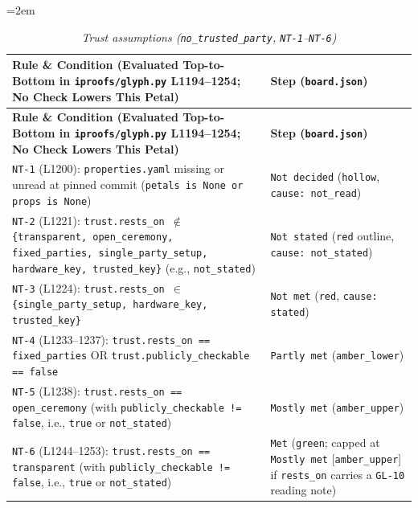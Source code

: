 \documentclass[11pt,letterpaper]{article}
\begin{document}
{\footnotesize\setlength{\tabcolsep}{4pt}\emergencystretch=2em
\begin{longtable}{@{}>{\raggedright\arraybackslash}p{} >{\raggedright\arraybackslash}p{}@{}}
\caption{\textit{Trust assumptions (\texttt{no\_\allowbreak{}trusted\_\allowbreak{}party}, \texttt{NT-1}--\texttt{NT-6})}} \\
\toprule
\textbf{Rule \& Condition (Evaluated Top-to-Bottom in \texttt{iproofs/\allowbreak{}glyph.\allowbreak{}py} L1194--1254; No Check Lowers This Petal)} & \textbf{Step (\texttt{board.\allowbreak{}json})} \\
\midrule
\endfirsthead
\toprule
\textbf{Rule \& Condition (Evaluated Top-to-Bottom in \texttt{iproofs/\allowbreak{}glyph.\allowbreak{}py} L1194--1254; No Check Lowers This Petal)} & \textbf{Step (\texttt{board.\allowbreak{}json})} \\
\midrule
\endhead
\bottomrule
\endfoot
\texttt{NT-1} (L1200): \texttt{properties.\allowbreak{}yaml} missing or unread at pinned commit (\texttt{petals is None or props is None}) & \texttt{Not decided} (\texttt{hollow}, \texttt{cause: not\_\allowbreak{}read}) \\
\texttt{NT-2} (L1221): \texttt{trust.\allowbreak{}rests\_\allowbreak{}on $\notin$ \{transparent, open\_\allowbreak{}ceremony, fixed\_\allowbreak{}parties, single\_\allowbreak{}party\_\allowbreak{}setup, hardware\_\allowbreak{}key, trusted\_\allowbreak{}key\}} (e.g., \texttt{not\_\allowbreak{}stated}) & \texttt{Not stated} (\texttt{red} outline, \texttt{cause: not\_\allowbreak{}stated}) \\
\texttt{NT-3} (L1224): \texttt{trust.\allowbreak{}rests\_\allowbreak{}on $\in$ \{single\_\allowbreak{}party\_\allowbreak{}setup, hardware\_\allowbreak{}key, trusted\_\allowbreak{}key\}} & \texttt{Not met} (\texttt{red}, \texttt{cause: stated}) \\
\texttt{NT-4} (L1233--1237): \texttt{trust.\allowbreak{}rests\_\allowbreak{}on == fixed\_\allowbreak{}parties} OR \texttt{trust.\allowbreak{}publicly\_\allowbreak{}checkable == false} & \texttt{Partly met} (\texttt{amber\_\allowbreak{}lower}) \\
\texttt{NT-5} (L1238): \texttt{trust.\allowbreak{}rests\_\allowbreak{}on == open\_\allowbreak{}ceremony} (with \texttt{publicly\_\allowbreak{}checkable != false}, i.e., \texttt{true} or \texttt{not\_\allowbreak{}stated}) & \texttt{Mostly met} (\texttt{amber\_\allowbreak{}upper}) \\
\texttt{NT-6} (L1244--1253): \texttt{trust.\allowbreak{}rests\_\allowbreak{}on == transparent} (with \texttt{publicly\_\allowbreak{}checkable != false}, i.e., \texttt{true} or \texttt{not\_\allowbreak{}stated}) & \texttt{Met} (\texttt{green}; capped at \texttt{Mostly met} [\texttt{amber\_\allowbreak{}upper}] if \texttt{rests\_\allowbreak{}on} carries a \texttt{GL-10} reading note) \\
\end{longtable}
}
\end{document}
